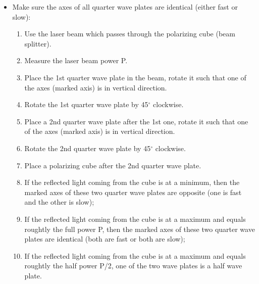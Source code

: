 {\begin{itemize}
\begin{enumerate}
\item Use the laser beam which passes through the polarizing cube (beam splitter).
\item Place the unknown wave plate in the beam.
\item Place a polarizing cube after the unknown wave plate.
\item Place a power meter perpendicular to the polarizing cube such that it
      measures the power of reflected light. 
\item Rotate the unknown wave plate such that the reflected light coming
  from the second cube is at a minimum.
\item Now one of the axes is in horizontal direction and the other is in
      vertical direction.
\end{enumerate}

\item Make sure the axes of all quarter wave plates are identical (either fast or slow):

\begin{enumerate}
\item Use the laser beam which passes through the polarizing cube (beam splitter).
\item Measure the laser beam power P.
\item Place the 1st quarter wave plate in the beam, rotate it such that one of the 
      axes (marked axis) is in vertical direction.
\item Rotate the 1st quarter wave plate by 45$^\circ$ clockwise.
\item Place a 2nd quarter wave plate after the 1st one, rotate it such that one of the 
      axes (marked axis) is in vertical direction.
\item Rotate the 2nd quarter wave plate by 45$^\circ$ clockwise.
\item Place a polarizing cube after the 2nd quarter wave plate.
\item If the reflected light coming from the cube is at a minimum, then the marked 
      axes of these two quarter wave plates are opposite (one is fast and the other 
      is slow);  
\item If the reflected light coming from the cube is at a maximum and equals roughtly 
      the full power P, then the marked 
      axes of these two quarter wave plates are identical (both are fast or both are 
      slow);  
\item If the reflected light coming from the cube is at a maximum and equals roughtly 
      the half power P/2, one of the two wave plates is a half wave plate.
\end{enumerate}
\end{itemize}

}
